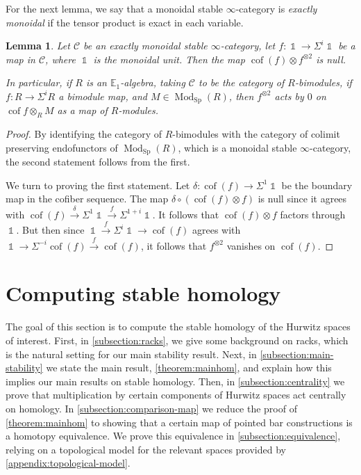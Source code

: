 \documentclass[12 pt]{amsart}
\theoremstyle{plain}
\newtheorem{lemma}[theorem]{Lemma}
\theoremstyle{definition}
\theoremstyle{remark}
\numberwithin{equation}{section}
\newcommand \cC{{\mathcal C}}
\DeclareMathOperator\Sp{Sp}
\DeclareMathOperator\cof{cof}
\DeclareMathOperator\unit{\mathbb{1}}
\DeclareMathOperator\Mod{Mod}
\newcommand\EE{\mathbb{E}}
\begin{document}
For the next lemma, we say that a 
monoidal stable $\infty$-category is {\em exactly monoidal} if the tensor product is
exact in each variable.
\begin{lemma}\label{lemma:squarenull}
	Let $\cC$ be an exactly
	monoidal stable $\infty$-category, let $f:\unit\to \Sigma^i\unit$ be a map in $\cC$, where $\unit$ is the monoidal unit.
	Then the map $\cof(f)\otimes f^{\otimes 2}$ is null. 
	
	In particular, if $R$ is an $\EE_1$-algebra, taking $\cC$ to be the category of $R$-bimodules, if $f:R \to \Sigma^iR$ a
	bimodule map, and $M \in \Mod_{\Sp}(R)$, then $f^{\otimes 2}$ acts by $0$ on $\cof f\otimes_RM$ as a map of $R$-modules.
\end{lemma}
\begin{proof}
	By identifying the category of $R$-bimodules with the category of colimit preserving endofunctors of $\Mod_{\Sp}(R)$, which is a monoidal stable $\infty$-category, the second statement follows from the first.
	
	We turn to proving the first statement. Let $\delta:\cof(f) \to \Sigma^{1}\unit$ be the boundary map in the cofiber sequence. The map $\delta\circ (\cof(f)\otimes f)$ is null since it agrees with $\cof(f) \xrightarrow{\delta} \Sigma^{1} \unit \xrightarrow{f} \Sigma^{1+i} \unit$. 
	It follows that $\cof(f)\otimes f$ factors through $\unit$. But then since $\unit \xrightarrow{f}\Sigma^i\unit \to \cof(f)$ agrees with $\unit \to \Sigma^{-i}\cof(f) \xrightarrow{f}\cof(f)$, it follows that $f^{\otimes2}$ vanishes on $\cof(f)$.
\end{proof}


\section{Computing stable homology}
\label{section:computing-stable-homology}
The goal of this section is to compute the stable homology of the Hurwitz spaces of interest.
First, in
\autoref{subsection:racks},
we give some background on racks, %
which is the natural setting for
our main stability result.
Next, in \autoref{subsection:main-stability} we state the main result,
\autoref{theorem:mainhom}, and explain how this implies our main results on
stable homology.
Then, in \autoref{subsection:centrality} we prove that
multiplication by certain components of Hurwitz spaces act centrally on homology.
In \autoref{subsection:comparison-map} we reduce the proof of
\autoref{theorem:mainhom} to showing that a certain map of pointed bar constructions is a homotopy equivalence. We prove this equivalence in
\autoref{subsection:equivalence}, relying on
a topological model for the relevant spaces provided by \autoref{appendix:topological-model}.
\end{document}
